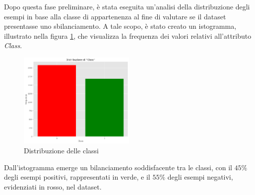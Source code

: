 Dopo questa fase preliminare, è stata eseguita un'analisi della distribuzione
degli esempi in base alla classe di appartenenza al fine di valutare se il
dataset presentasse uno sbilanciamento. A tale scopo, è stato creato un
istogramma, illustrato nella figura \ref{fig:dist-classi}, che visualizza la
frequenza dei valori relativi all'attributo \textit{Class}.
\begin{figure}[!ht]
      \centering
      \includegraphics[width=0.5\textwidth]{img/analisi/distribuzioneClassi.png}
      \caption{Distribuzione delle classi}
      \label{fig:dist-classi}
\end{figure}

Dall'istogramma emerge un bilanciamento soddisfacente tra le classi, con il
$45\%$ degli esempi positivi, rappresentati in verde, e il $55\%$ degli esempi
negativi, evidenziati in rosso, nel dataset.

